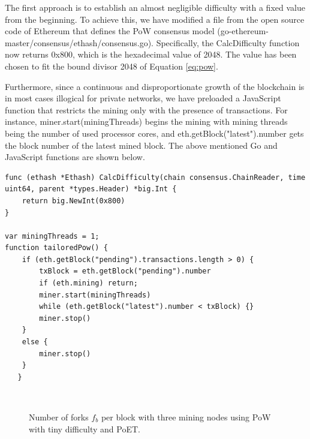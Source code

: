 The first approach is to establish an almost negligible difficulty with a fixed value from the beginning. To achieve this, we have modified a file from the open source code of Ethereum that defines the PoW consensus model (go-ethereum-master/consensus/ethash/consensus.go). Specifically, the CalcDifficulty function now returns 0x800, which is the hexadecimal value of 2048. The value has been chosen to fit the bound divisor 2048 of Equation \ref{eq:pow}. 

Furthermore, since a continuous and disproportionate growth of the blockchain is in most cases illogical for private networks, we have preloaded a JavaScript function that restricts the mining only with the presence of transactions. For instance, miner.start(miningThreads) begins the mining with mining threads being the number of used processor cores, and eth.getBlock("latest").number gets the block number of the latest mined block. The above mentioned Go and JavaScript functions are shown below.
\newline

\begin{lstlisting}
func (ethash *Ethash) CalcDifficulty(chain consensus.ChainReader, time uint64, parent *types.Header) *big.Int {
    return big.NewInt(0x800)
}

var miningThreads = 1;
function tailoredPow() {
    if (eth.getBlock("pending").transactions.length > 0) {
        txBlock = eth.getBlock("pending").number
        if (eth.mining) return;
        miner.start(miningThreads)
        while (eth.getBlock("latest").number < txBlock) {}
        miner.stop()
    }
    else {
        miner.stop()
    }
   }
\end{lstlisting}

\begin{figure}[bth]
	\myfloatalign
	 \quad
	 \\
	\caption{Number of forks $f_b$ per block with three mining nodes using PoW with tiny difficulty and PoET.}
	\label{fig:forks}
\end{figure}

